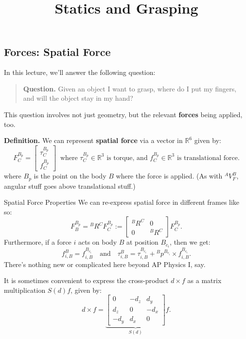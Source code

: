 \title{Statics and Grasping}



\subsection{Forces: Spatial Force}

In this lecture, we'll answer the following question:
\begin{quote}
    \textbf{Question.}
    Given an object I want to grasp,
    where do I put my fingers,
    and will the object stay in my hand?
\end{quote}
This question involves not just geometry,
but the relevant \textbf{forces} being applied, too.

\textbf{Definition.}
We can represent \textbf{spatial force} via
a vector in $\mathbb{R}^6$ given by:
\[
F^{B_p}_C = \begin{bmatrix}
\tau_C^{B_p} \\ f_C^{B_p}
\end{bmatrix} ~ \text{ where } 
\tau^{B_p}_C \in \mathbb{R}^3 \text{ is torque, and }
f^{B_p}_C \in \mathbb{R}^3 \text{ is translational force.}
\]
where $B_p$ is the point on the body $B$ where the force is applied.
(As with ${}^AV^B_F$, angular stuff goes above translational stuff.)

\begin{theorem}{Spatial Force Properties}
    We can re-express spatial force in different frames like so:
    \[
    F^{B_p}_B = {}^BR^C F^{B_p}_C
    := \begin{bmatrix}
    {}^BR^C & 0 \\ 0 & {}^BR^C
    \end{bmatrix} F^{B_p}_C.
    \]
    Furthermore, if a force $i$ acts on body $B$
    at position $B_{c_i}$, then we get:
    \[
    f^B_{i, B} = f^{B_{c_i}}_{i, B}
    ~~~ \text{ and } ~~~
    \tau^B_{i, B} = \tau^{B_{c_i}}_{i, B}
    + {}^Bp^{B_{c_i}} \times f^{B_{c_i}}_{i, B}.
    \]
    There's nothing new or complicated here beyond AP Physics I, say.
\end{theorem}

\begin{remark}
    It is sometimes convenient to express the cross-product $d \times f$
    as a matrix multiplication $S(d) f$, given by:
    \[
    d \times f = \underbrace{\begin{bmatrix}
    0 & -d_z & d_y \\ d_z & 0 & -d_x \\ -d_y & d_x & 0
    \end{bmatrix}}_{S(d)} f.
    \]
\end{remark}

